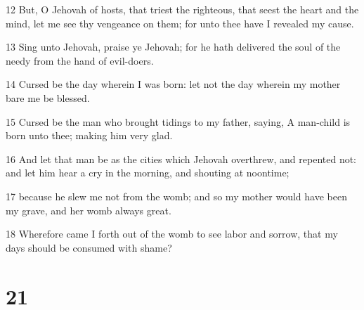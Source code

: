 \par 12 But, O Jehovah of hosts, that triest the righteous, that seest the heart and the mind, let me see thy vengeance on them; for unto thee have I revealed my cause.
\par 13 Sing unto Jehovah, praise ye Jehovah; for he hath delivered the soul of the needy from the hand of evil-doers.
\par 14 Cursed be the day wherein I was born: let not the day wherein my mother bare me be blessed.
\par 15 Cursed be the man who brought tidings to my father, saying, A man-child is born unto thee; making him very glad.
\par 16 And let that man be as the cities which Jehovah overthrew, and repented not: and let him hear a cry in the morning, and shouting at noontime;
\par 17 because he slew me not from the womb; and so my mother would have been my grave, and her womb always great.
\par 18 Wherefore came I forth out of the womb to see labor and sorrow, that my days should be consumed with shame?

\chapter{21}

